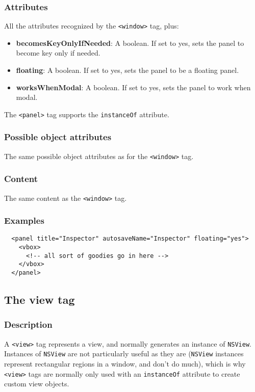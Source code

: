 \subsubsection{Attributes}
All the attributes recognized by the \texttt{<window>} tag, plus:
\begin{itemize}
\item {\bf becomesKeyOnlyIfNeeded}: A boolean.  If set to yes, sets the panel
to become key only if needed.
\item {\bf floating}: A boolean.  If set to yes, sets the panel
to be a floating panel.
\item {\bf worksWhenModal}: A boolean.  If set to yes, sets the panel
to work when modal.
\end{itemize}

The \texttt{<panel>} tag supports the \texttt{instanceOf} attribute.

\subsubsection{Possible object attributes}
The same possible object attributes as for the \texttt{<window>} tag.

\subsubsection{Content}
The same content as the \texttt{<window>} tag.

\subsubsection{Examples}
\begin{verbatim}
  <panel title="Inspector" autosaveName="Inspector" floating="yes">
    <vbox>
      <!-- all sort of goodies go in here -->
    </vbox>
  </panel>
\end{verbatim}

\subsection{The view tag}

\subsubsection{Description}
A \texttt{<view>} tag represents a view, and normally generates an
instance of \texttt{NSView}.  Instances of \texttt{NSView} are not
particularly useful as they are (\texttt{NSView} instances represent
rectangular regions in a window, and don't do much), which is why
\texttt{<view>} tags are normally only used with an \texttt{instanceOf}
 attribute to create custom view objects.

